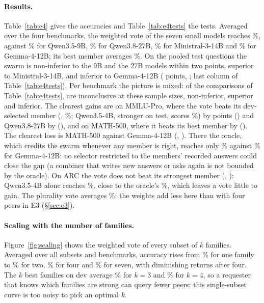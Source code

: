 \documentclass[11pt]{article}
\theoremstyle{definition}
\theoremstyle{remark}
\begin{document}
\paragraph{Results.} Table~\ref{tab:e4} gives the accuracies and Table~\ref{tab:e4tests} the tests. Averaged
over the four benchmarks, the weighted vote of the seven small models reaches \eFourMeanSwarm\%, against
\eFourMeanQwenNine\% for Qwen3.5-9B, \eFourMeanQwenTwentySeven\% for Qwen3.8-27B, \eFourMeanMinistralFourteen\%
for Ministral-3-14B and \eFourMeanGemmaTwelve\% for Gemma-4-12B; its best member averages
\eFourMeanQwenFour\%. On the pooled test questions the swarm is non-inferior to the 9B and the 27B models
within two points, superior to Ministral-3-14B, and inferior to Gemma-4-12B
(\eFourPooledGemmaTwelveDiff{} points, \eFourPooledGemmaTwelveCI; last column of
Table~\ref{tab:e4tests}). Per benchmark the picture is mixed: of the \eFourNShown{} comparisons of Table~\ref{tab:e4tests},
\eFourNInconclusive{} are inconclusive at these sample sizes, \eFourNNonInferior{} non-inferior,
\eFourNSuperior{} superior and \eFourNInferior{} inferior. The clearest gains are on MMLU-Pro, where the vote
beats its dev-selected member (\eFourMmluBestName, \eFourMmluGemmaEFour\%; Qwen3.5-4B, stronger on test,
scores \eFourMmluQwenFour\%) by \eFourMmluBestDiff{} points (\eFourMmluBestCI) and Qwen3.8-27B by
\eFourMmluQwenTwentySevenDiff{} (\eFourMmluQwenTwentySevenCI), and on MATH-500, where it beats its best member
by \eFourMathBestDiff{} (\eFourMathBestCI). The clearest loss is MATH-500 against Gemma-4-12B
(\eFourMathGemmaTwelveDiff, \eFourMathGemmaTwelveCI). There the oracle, which credits the swarm whenever any
member is right, reaches only \eFourMathOracle\% against \eFourMathGemmaTwelve\% for Gemma-4-12B: no selector
restricted to the members' recorded answers could close the gap (a combiner that writes new answers or asks
again is not bounded by the oracle). On
ARC the vote does not beat its strongest member (\eFourArcBestDiff, \eFourArcBestCI): Qwen3.5-4B alone
reaches \eFourArcQwenFour\%, close to the oracle's \eFourArcOracle\%, which leaves a vote little to gain.
The plurality vote averages \eFourMeanVote\%: the weights add less here than with four peers in E3
(\S\ref{sec:e3}).

\paragraph{Scaling with the number of families.} Figure~\ref{fig:scaling} shows the weighted vote of every
subset of $k$ families. Averaged over all subsets and benchmarks, accuracy rises from \eFourMeanScaleOne\%
for one family to \eFourMeanScaleTwo\% for two, \eFourMeanScaleFour\% for four and \eFourMeanScaleSeven\% for
seven, with diminishing returns after four. The $k$ best families on dev average \eFourMeanBestThree\% for
$k=3$ and \eFourMeanBestFour\% for $k=4$, so a requester that knows which families are strong can query
fewer peers; this single-subset curve is too noisy to pick an optimal $k$.
\end{document}
